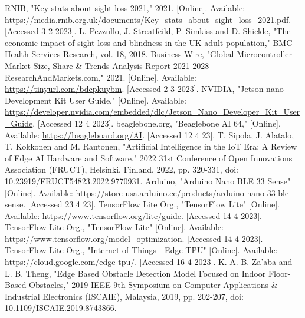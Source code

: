 \documentclass{svproc}
\begin{document}
%
%
\begin{thebibliography}{00}
     RNIB, "Key stats about sight loss 2021," 2021. [Online]. Available: \url{https://media.rnib.org.uk/documents/Key_stats_about_sight_loss_2021.pdf.} [Accessed 3 2 2023].
     L. Pezzullo, J. Streatfeild, P. Simkiss and D. Shickle, "The economic impact of sight loss and blindness in the UK adult population," BMC Health Services Research, vol. 18, 2018. 
     Business Wire, "Global Microcontroller Market Size, Share \& Trends Analysis Report 2021-2028 - ResearchAndMarkets.com," 2021. [Online]. Available: \url{https://tinyurl.com/bdcpkuybm}. [Accessed 2 3 2023].
      NVIDIA, "Jetson nano Development Kit User Guide," [Online]. Available: \url{https://developer.nvidia.com/embedded/dlc/Jetson_Nano_Developer_Kit_User_Guide}. [Accessed 12 4 2023].
     beaglebone.org, "Beaglebone AI 64," [Online]. Available: \url{https://beagleboard.org/AI}. [Accessed 12 4 23].
     T. Sipola, J. Alatalo, T. Kokkonen and M. Rantonen, "Artificial Intelligence in the IoT Era: A Review of Edge AI Hardware and Software," 2022 31st Conference of Open Innovations Association (FRUCT), Helsinki, Finland, 2022, pp. 320-331, doi: 10.23919/FRUCT54823.2022.9770931.
     Arduino, "Arduino Nano BLE 33 Sense" [Online]. Available: \url{https://store-usa.arduino.cc/products/arduino-nano-33-ble-sense}. [Accessed 23 4 23].
     TensorFlow Lite Org., "TensorFlow Lite" [Online]. Available: \url{https://www.tensorflow.org/lite/guide}. [Accessed 14 4 2023].
     TensorFlow Lite Org., "TensorFlow Lite" [Online]. Available: \url{https://www.tensorflow.org/model_optimization}. [Accessed 14 4 2023].
     TensorFlow Lite Org., "Internet of Things - Edge TPU" [Online]. Available: \url{https://cloud.google.com/edge-tpu/}. [Accessed 16 4 2023].
     K. A. B. Za’aba and L. B. Theng, "Edge Based Obstacle Detection Model Focused on Indoor Floor-Based Obstacles," 2019 IEEE 9th Symposium on Computer Applications \& Industrial Electronics (ISCAIE), Malaysia, 2019, pp. 202-207, doi: 10.1109/ISCAIE.2019.8743866.

\end{thebibliography}
\end{document}
